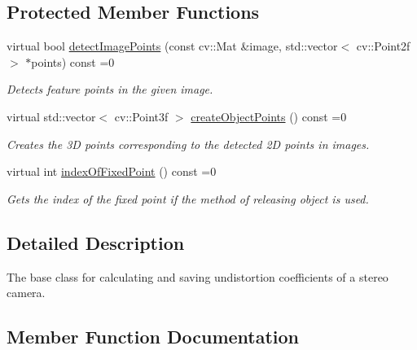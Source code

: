 \subsection*{Protected Member Functions}
\begin{DoxyCompactItemize}
\item 
virtual bool \hyperlink{classstereo__ugv_1_1LensCalibrator_a9be834b0ef2983af47ac5f9dd67887fe}{detect\+Image\+Points} (const cv\+::\+Mat \&image, std\+::vector$<$ cv\+::\+Point2f $>$ $\ast$points) const =0
\begin{DoxyCompactList}\small\item\em Detects feature points in the given image. \end{DoxyCompactList}\item 
virtual std\+::vector$<$ cv\+::\+Point3f $>$ \hyperlink{classstereo__ugv_1_1LensCalibrator_a3edf81dfc9567904a0d1a7c3555d65bf}{create\+Object\+Points} () const =0
\begin{DoxyCompactList}\small\item\em Creates the 3D points corresponding to the detected 2D points in images. \end{DoxyCompactList}\item 
virtual int \hyperlink{classstereo__ugv_1_1LensCalibrator_ad25267d7b60a912f270701359eda1c54}{index\+Of\+Fixed\+Point} () const =0
\begin{DoxyCompactList}\small\item\em Gets the index of the fixed point if the method of releasing object is used. \end{DoxyCompactList}\end{DoxyCompactItemize}


\subsection{Detailed Description}
The base class for calculating and saving undistortion coefficients of a stereo camera. 

\subsection{Member Function Documentation}
\mbox{\label{classstereo__ugv_1_1LensCalibrator_a570522d1aa54e4ec153b47f6b86063e2}} 
